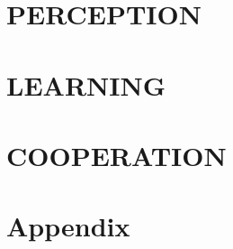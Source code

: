 \documentclass[11pt,a4paper,oneside,english]{book}
\theoremstyle{definition}
\theoremstyle{nopoint}
\begin{document}
\renewcommand{\theequation}{\arabic{chapter}.\arabic{equation}} %
\renewcommand{\thesection}{\arabic{chapter}.\arabic{section}} %


\mainmatter

%

%
\part{PERCEPTION}
\label{part:1}


\part{LEARNING}
\label{part:2}


\part{COOPERATION}
\label{part:3}




%



\part{Appendix}

\renewcommand{\thesection}{\Alph{chapter}.\arabic{section}}

\begin{appendices}
	
	
	
\end{appendices}



\backmatter


\normalem


\end{document}

